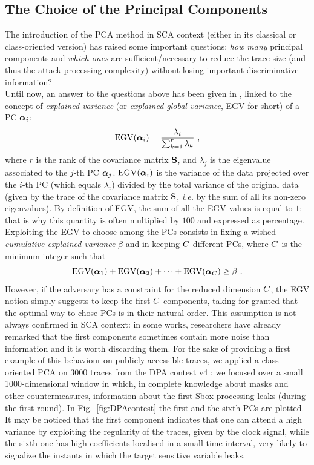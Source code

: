 \subsection{The Choice of the Principal Components}\label{sec:ELV}
The introduction of the PCA method in SCA context (either in its classical or class-oriented version)  has raised some important questions: \textit{how many} principal components and \textit{which ones} are sufficient/necessary to reduce the trace size (and thus the attack processing complexity) without losing important discriminative information?\\

Until now, an answer to the questions above has been given in \cite{choudary2014efficient}, linked to the concept of {\em explained variance} (or {\em explained global variance}, EGV for short) of a PC $\boldsymbol{\alpha}_i$:
\begin{equation}\label{eq:EGV}
\mathrm{EGV}(\boldsymbol{\alpha}_i) =  \frac{\lambda_i}{\sum_{k=1}^r\lambda_k} \mbox{ ,}
\end{equation}
where $r$ is the rank of the covariance matrix $\textbf{S}$, and $\lambda_j$ is the eigenvalue associated to the $j$-th PC $\boldsymbol{\alpha}_j$. $\mathrm{EGV}(\boldsymbol{\alpha}_i)$ is the variance of the data projected over the $i$-th PC (which equals $\lambda_i$) divided by the total variance of the original data (given by the trace of the covariance matrix $\textbf{S}$, {\em i.e.} by the sum of all its non-zero eigenvalues). By definition of EGV, the sum of all the EGV values is equal to $1$; that is why this quantity is often multiplied by $100$ and expressed as percentage.
Exploiting the EGV to choose among the PCs consists in fixing a wished {\em cumulative explained variance} $\beta$ and in keeping $C$ different PCs, where $C$ is the minimum integer such that
\begin{equation}
\mbox{EGV}(\boldsymbol{\alpha}_1) +\mbox{EGV}(\boldsymbol{\alpha}_2) + \dots +\mbox{EGV}(\boldsymbol{\alpha}_C) \geq \beta \mbox{ .}
\end{equation}
However, if the adversary has a constraint for the reduced dimension $C$, the EGV notion simply suggests to keep the first $C$ components, taking for granted that the optimal way to chose PCs is in their natural order. This assumption is not always confirmed in SCA context: in some works, researchers have already remarked that the first components sometimes contain more noise than information \cite{Batina2012,specht} and it is worth discarding them. For the sake of providing a first example of this behaviour on publicly accessible traces, we applied a class-oriented PCA on 3000 traces from the DPA contest v4 \cite{DPAcontest}; we focused over a small 1000-dimensional window in which, in complete knowledge about masks and other countermeasures, information about the first Sbox processing leaks (during the first round). In Fig.~\ref{fig:DPAcontest} the first and the sixth PCs are plotted. It may be noticed that the first component indicates that one can attend a high variance by exploiting the regularity of the traces, given by the clock signal, while the sixth one has high coefficients localised in a small time interval, very likely to signalize the instants in which the target sensitive variable leaks.

